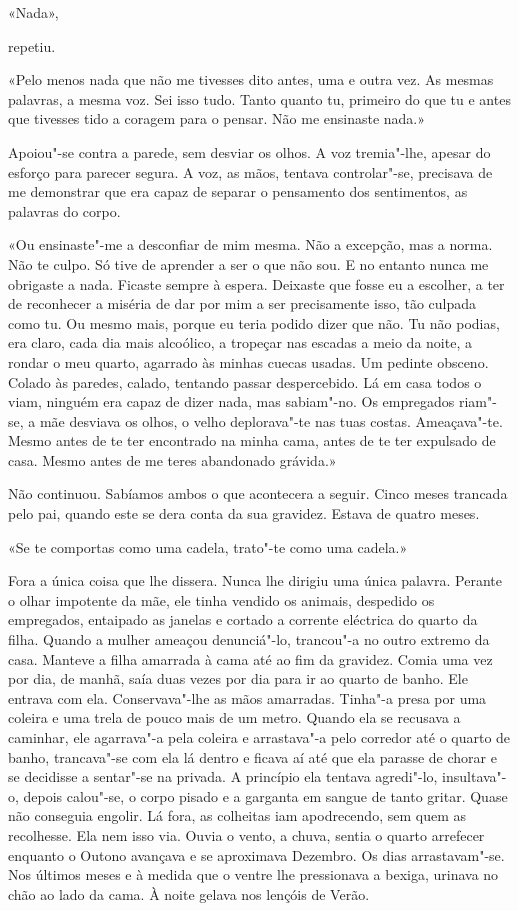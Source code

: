 «Nada»,

repetiu.

«Pelo menos nada que não me tivesses dito antes, uma e outra vez. As
mesmas palavras, a mesma voz. Sei isso tudo. Tanto quanto tu, primeiro
do que tu e antes que tivesses tido a coragem para o pensar. Não me
ensinaste nada.»

Apoiou"-se contra a parede, sem desviar os olhos. A voz tremia"-lhe,
apesar do esforço para parecer segura. A voz, as mãos, tentava
controlar"-se, precisava de me demonstrar que era capaz de separar o
pensamento dos sentimentos, as palavras do corpo.

«Ou ensinaste"-me a desconfiar de mim mesma. Não a excepção, mas a
norma. Não te culpo. Só tive de aprender a ser o que não sou. E no
entanto nunca me obrigaste a nada. Ficaste sempre à espera. Deixaste que
fosse eu a escolher, a ter de reconhecer a miséria de dar por mim a ser
precisamente isso, tão culpada como tu. Ou mesmo mais, porque eu teria
podido dizer que não. Tu não podias, era claro, cada dia mais alcoólico,
a tropeçar nas escadas a meio da noite, a rondar o meu quarto, agarrado
às minhas cuecas usadas. Um pedinte obsceno. Colado às paredes, calado,
tentando passar despercebido. Lá em casa todos o viam, ninguém era capaz
de dizer nada, mas sabiam"-no. Os empregados riam"-se, a mãe desviava os
olhos, o velho deplorava"-te nas tuas costas. Ameaçava"-te. Mesmo antes
de te ter encontrado na minha cama, antes de te ter expulsado de casa.
Mesmo antes de me teres abandonado grávida.»

Não continuou. Sabíamos ambos o que acontecera a seguir. Cinco meses
trancada pelo pai, quando este se dera conta da sua gravidez. Estava de
quatro meses.

«Se te comportas como uma cadela, trato"-te como uma cadela.»

Fora a única coisa que lhe dissera. Nunca lhe dirigiu uma única palavra.
Perante o olhar impotente da mãe, ele tinha vendido os animais,
despedido os empregados, entaipado as janelas e cortado a corrente
eléctrica do quarto da filha. Quando a mulher ameaçou denunciá"-lo,
trancou"-a no outro extremo da casa. Manteve a filha amarrada à cama até
ao fim da gravidez. Comia uma vez por dia, de manhã, saía duas vezes por
dia para ir ao quarto de banho. Ele entrava com ela. Conservava"-lhe as
mãos amarradas. Tinha"-a presa por uma coleira e uma trela de pouco mais
de um metro. Quando ela se recusava a caminhar, ele agarrava"-a pela
coleira e arrastava"-a pelo corredor até o quarto de banho,
trancava"-se com ela lá dentro e ficava aí até que ela parasse de chorar
e se decidisse a sentar"-se na privada. A princípio ela tentava
agredi"-lo, insultava"-o, depois calou"-se, o corpo pisado e a garganta
em sangue de tanto gritar. Quase não conseguia engolir. Lá fora, as
colheitas iam apodrecendo, sem quem as recolhesse. Ela nem isso via.
Ouvia o vento, a chuva, sentia o quarto arrefecer enquanto o Outono
avançava e se aproximava Dezembro. Os dias arrastavam"-se. Nos últimos
meses e à medida que o ventre lhe pressionava a bexiga, urinava no chão
ao lado da cama. À noite gelava nos lençóis de Verão.

